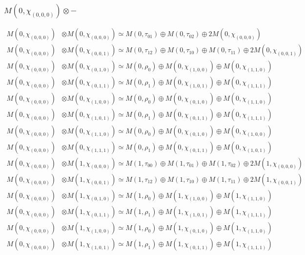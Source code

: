 \subsubsection{$ M(0,\chi_{(0,0,0)})\otimes -$}
\begin{align*}
M(0,\chi_{(0,0,0)}) &\otimes M(0,\chi_{(0,0,0)}) \simeq M(0,\tau_{01}) \oplus M(0,\tau_{02}) \oplus 2 M(0,\chi_{(0,0,0)}) \\
M(0,\chi_{(0,0,0)}) &\otimes M(0,\chi_{(0,0,1)}) \simeq M(0,\tau_{12}) \oplus M(0,\tau_{10}) \oplus M(0,\tau_{11}) \oplus 2 M(0,\chi_{(0,0,1)}) \\
M(0,\chi_{(0,0,0)}) &\otimes M(0,\chi_{(0,1,0)}) \simeq M(0,\rho_{0}) \oplus M(0,\chi_{(1,0,0)}) \oplus M(0,\chi_{(1,1,0)}) \\
M(0,\chi_{(0,0,0)}) &\otimes M(0,\chi_{(0,1,1)}) \simeq M(0,\rho_{1}) \oplus M(0,\chi_{(1,0,1)}) \oplus M(0,\chi_{(1,1,1)}) \\
M(0,\chi_{(0,0,0)}) &\otimes M(0,\chi_{(1,0,0)}) \simeq M(0,\rho_{0}) \oplus M(0,\chi_{(0,1,0)}) \oplus M(0,\chi_{(1,1,0)}) \\
M(0,\chi_{(0,0,0)}) &\otimes M(0,\chi_{(1,0,1)}) \simeq M(0,\rho_{1}) \oplus M(0,\chi_{(0,1,1)}) \oplus M(0,\chi_{(1,1,1)}) \\
M(0,\chi_{(0,0,0)}) &\otimes M(0,\chi_{(1,1,0)}) \simeq M(0,\rho_{0}) \oplus M(0,\chi_{(0,1,0)}) \oplus M(0,\chi_{(1,0,0)}) \\
M(0,\chi_{(0,0,0)}) &\otimes M(0,\chi_{(1,1,1)}) \simeq M(0,\rho_{1}) \oplus M(0,\chi_{(0,1,1)}) \oplus M(0,\chi_{(1,0,1)}) \\
M(0,\chi_{(0,0,0)}) &\otimes M(1,\chi_{(0,0,0)}) \simeq M(1,\tau_{00}) \oplus M(1,\tau_{01}) \oplus M(1,\tau_{02}) \oplus 2 M(1,\chi_{(0,0,0)}) \\
M(0,\chi_{(0,0,0)}) &\otimes M(1,\chi_{(0,0,1)}) \simeq M(1,\tau_{12}) \oplus M(1,\tau_{10}) \oplus M(1,\tau_{11}) \oplus 2 M(1,\chi_{(0,0,1)}) \\
M(0,\chi_{(0,0,0)}) &\otimes M(1,\chi_{(0,1,0)}) \simeq M(1,\rho_{0}) \oplus M(1,\chi_{(1,0,0)}) \oplus M(1,\chi_{(1,1,0)}) \\
M(0,\chi_{(0,0,0)}) &\otimes M(1,\chi_{(0,1,1)}) \simeq M(1,\rho_{1}) \oplus M(1,\chi_{(1,0,1)}) \oplus M(1,\chi_{(1,1,1)}) \\
M(0,\chi_{(0,0,0)}) &\otimes M(1,\chi_{(1,0,0)}) \simeq M(1,\rho_{0}) \oplus M(1,\chi_{(0,1,0)}) \oplus M(1,\chi_{(1,1,0)}) \\
M(0,\chi_{(0,0,0)}) &\otimes M(1,\chi_{(1,0,1)}) \simeq M(1,\rho_{1}) \oplus M(1,\chi_{(0,1,1)}) \oplus M(1,\chi_{(1,1,1)}) \\

\end{align*}
